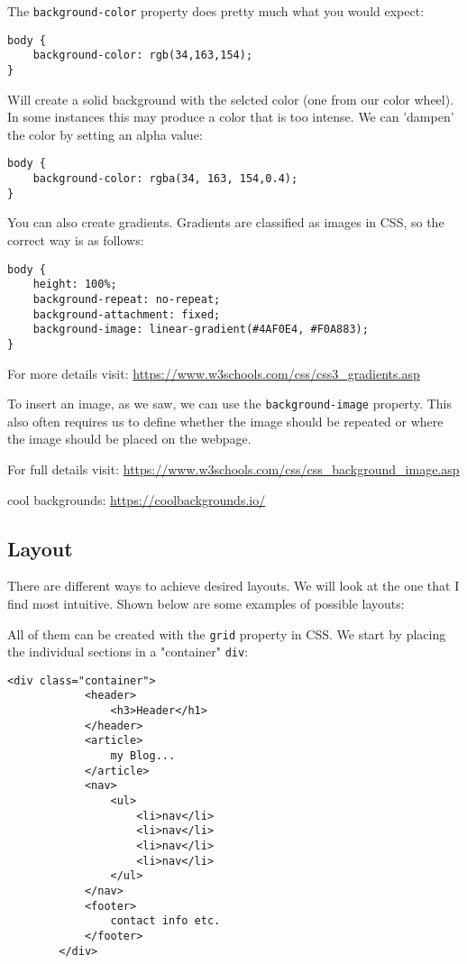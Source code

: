 \documentclass[english,11pt,a4paper]{report}
\begin{document}
The \verb|background-color| property does pretty much what you would expect: 
\begin{lstlisting}[style=htmlcssjs]
body { 
	background-color: rgb(34,163,154);
}
\end{lstlisting}
Will create a solid background with the selcted color (one from our color wheel). In some instances this may produce a color that is too intense. We can 'dampen' the color by setting an alpha value: 
\begin{lstlisting}[style=htmlcssjs]
body {
    background-color: rgba(34, 163, 154,0.4);
}
\end{lstlisting}
You can also create gradients. Gradients are classified as images in CSS, so the correct way is as follows:
\begin{lstlisting}[style=htmlcssjs]
body {
    height: 100%;
    background-repeat: no-repeat;
    background-attachment: fixed;
    background-image: linear-gradient(#4AF0E4, #F0A883);
}
\end{lstlisting} 
For more details visit: \url{https://www.w3schools.com/css/css3_gradients.asp}

To insert an image, as we saw, we can use the \verb|background-image| property. This also often requires us to define whether the image should be repeated or where the image should be placed on the webpage.

For full details visit: \url{https://www.w3schools.com/css/css_background_image.asp}

cool backgrounds: \url{https://coolbackgrounds.io/}

\subsection{Layout}

There are different ways to achieve desired layouts. We will look at the one that I find most intuitive. Shown below are some examples of possible layouts:

%
%
%

All of them can be created with the \verb|grid| property in CSS.  We start by placing the individual sections in a "container" \verb|div|: 
\begin{lstlisting}[style=htmlcssjs]
<div class="container">
            <header>
                <h3>Header</h1>
            </header>
            <article>
                my Blog...
            </article>
            <nav>
                <ul>
                    <li>nav</li>
                    <li>nav</li>
                    <li>nav</li>
                    <li>nav</li>
                </ul>
            </nav>
            <footer>
                contact info etc.
            </footer>
        </div>
\end{lstlisting}
\end{document}
